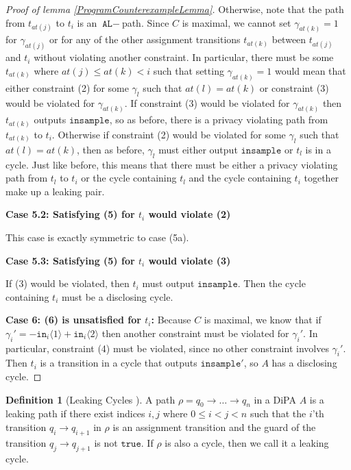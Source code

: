 \documentclass[12pt]{article}
\newcommand{\brangle}[1]{\langle #1 \rangle}
\theoremstyle{definition}
\newtheorem{defn}[thm]{Definition}
\begin{document}
\begin{proof}[Proof of lemma \ref{ProgramCounterexampleLemma}]
    Otherwise, note that the path from $t_{at(j)}$ to $t_i$ is an $\texttt{AL}-$path. Since $C$ is maximal, we cannot set $\gamma_{at(k)}=1$ for $\gamma_{at(j)}$ or for any of the other assignment transitions $t_{at(k)}$ between $t_{at(j)}$ and $t_i$ without violating another constraint. 
    In particular, there must be some $t_{at(k)}$ where $at(j)\leq at(k)<i$ such that setting $\gamma_{at(k)} = 1$ would mean that either constraint (2) for some $\gamma_l$ such that $at(l) = at(k)$ or constraint (3) would be violated for $\gamma_{at(k)}$. 
    If constraint (3) would be violated for $\gamma_{at(k)}$ then $t_{at(k)}$ outputs $\texttt{insample}$, so as before, there is a privacy violating path from $t_{at(k)}$ to $t_i$. Otherwise if constraint (2) would be violated for some $\gamma_l$ such that $at(l) = at(k)$, then as before, $\gamma_l$ must either output $\texttt{insample}$ or $t_l$ is in a cycle. 
    Just like before, this means that there must be either a privacy violating path from $t_l$ to $t_i$ or the cycle containing $t_l$ and the cycle containing $t_i$ together make up a leaking pair. 

    \textbf{Case 5.2: Satisfying (5) for $t_i$ would violate (2)}

    This case is exactly symmetric to case (5a).

    \textbf{Case 5.3: Satisfying (5) for $t_i$ would violate (3)}

    If (3) would be violated, then $t_i$ must output $\texttt{insample}$. Then the cycle containing $t_i$ must be a disclosing cycle. 
    
    \textbf{Case 6: (6) is unsatisfied for $t_i$:} Because $C$ is maximal, we know that if $\gamma_i' = -\texttt{in}_i\brangle{1}+\texttt{in}_i\brangle{2}$ then another constraint must be violated for $\gamma_i'$. In particular, constraint (4) must be violated, since no other constraint involves $\gamma_i'$. 
    Then $t_i$ is a transition in a cycle that outputs $\texttt{insample}'$, so $A$ has a disclosing cycle.
\end{proof}


\begin{defn}[Leaking Cycles \cite{chadhaLinearTimeDecidability2021}]
    A path $\rho = q_0\to\ldots \to q_n$ in a DiPA $A$ is a leaking path if there exist indices $i, j$ where $0\leq i < j < n$ such that the $i$'th transition $q_i\to q_{i+1}$ in $\rho$ is an assignment transition and the guard of the transition $q_j \to q_{j+1}$ is not $\texttt{true}$. If $\rho$ is also a cycle, then we call it a leaking cycle.
\end{defn}
\end{document}
